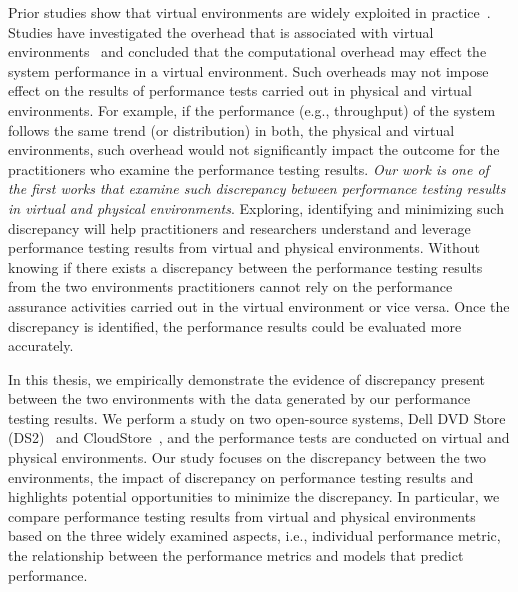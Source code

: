 \begin{sloppypar}
Prior studies show that virtual environments are widely exploited in practice~\cite{Cito:2015:MCA:2786805.2786826,Nguyen:2012:ADP:2188286.2188344,xiong2013vperfguard}. Studies have investigated the overhead that is associated with virtual environments~\cite{menon2005diagnosing} and concluded that the computational overhead may effect the system performance in a virtual environment. Such overheads may not impose effect on the results of performance tests carried out in physical and virtual environments. For example, if the performance (e.g., throughput) of the system follows the same trend (or distribution) in both, the physical and virtual environments, such overhead would not significantly impact the outcome for the practitioners who examine the performance testing results. \textit{Our work is one of the first works that examine such discrepancy between performance testing results in virtual and physical environments}. Exploring, identifying and minimizing such discrepancy will help practitioners and researchers understand and leverage performance testing results from virtual and physical environments. Without knowing if there exists a discrepancy between the performance testing results from the two environments practitioners cannot rely on the performance assurance activities carried out in the virtual environment or vice versa. Once the discrepancy is identified, the performance results could be evaluated more accurately.
\end{sloppypar}

In this thesis, we empirically demonstrate the evidence of discrepancy present between the two environments with the data generated by our performance testing results. We perform a study on two open-source systems, Dell DVD Store (DS2)~\cite{delldvd} and CloudStore~\cite{cloudstore}, and the performance tests are conducted on virtual and physical environments. Our study focuses on the discrepancy between the two environments, the impact of discrepancy on performance testing results and highlights potential opportunities to minimize the discrepancy. In particular, we compare performance testing results from virtual and physical environments based on the three widely examined aspects, i.e., individual performance metric, the relationship between the performance metrics and models that predict performance. 

